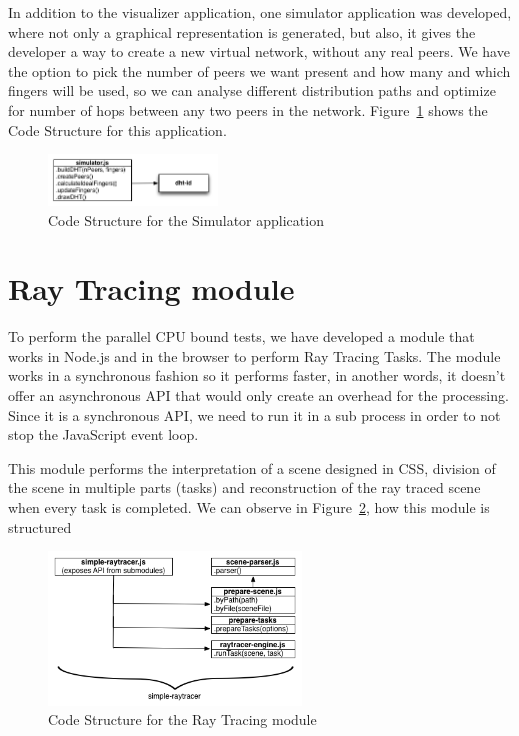 In addition to the visualizer application, one simulator application was developed, where not only a graphical representation is generated, but also, it gives the developer a way to create a new virtual network, without any real peers. We have the option to pick the number of peers we want present and how many and which fingers will be used, so we can analyse different distribution paths and optimize for number of hops between any two peers in the network. Figure~\ref{fig:d-s} shows the Code Structure for this application.


\begin{figure}[h!]
  \centering
  \includegraphics[width=0.4\textwidth]{figs/diagram-simulator}
  \caption{Code Structure for the Simulator application}
  \label{fig:d-s}
\end{figure}

\section{Ray Tracing module}

To perform the parallel CPU bound tests, we have developed a module that works in Node.js and in the browser to perform Ray Tracing Tasks. The module works in a synchronous fashion so it performs faster, in another words, it doesn't offer an asynchronous API that would only create an overhead for the processing. Since it is a synchronous API, we need to run it in a sub process in order to not stop the JavaScript event loop.

This module performs the interpretation of a scene designed in CSS, division of the scene in multiple parts (tasks) and reconstruction of the ray traced scene when every task is completed. We can observe in Figure~\ref{fig:d-s-r}, how this module is structured

\begin{figure}[h!]
  \centering
  \includegraphics[width=0.6\textwidth]{figs/diagram-simple-raytracer}
  \caption{Code Structure for the Ray Tracing module}
  \label{fig:d-s-r}
\end{figure}

